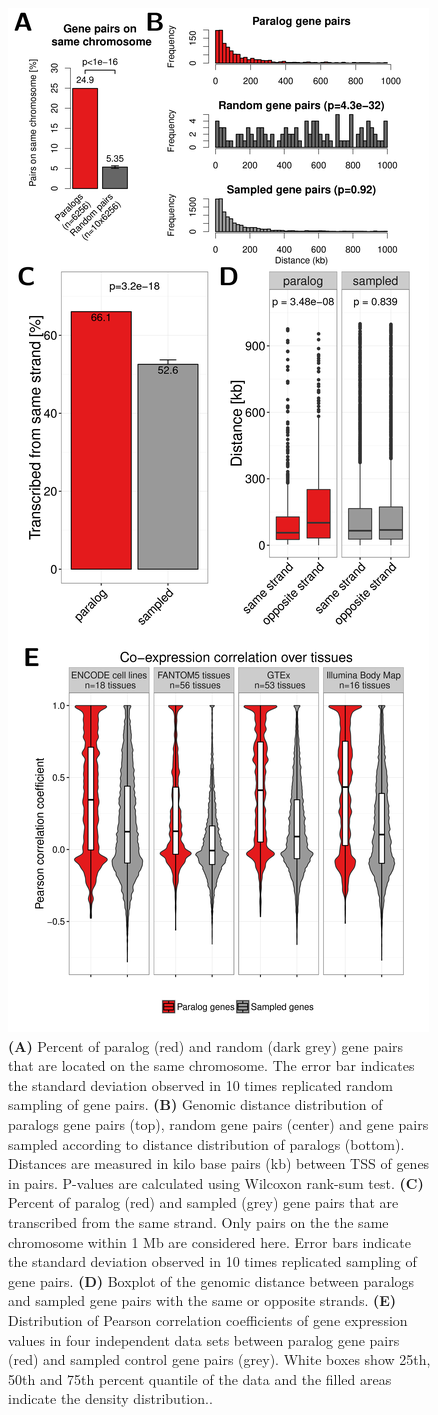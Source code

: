\documentclass[a4paper,twoside=true,openright,parskip=full,chapterprefix=true,11pt,headings=normal,bibliography=totoc,listof=totoc,titlepage=on,captions=tableabove,draft=false]{scrreprt}
\theoremstyle{definition}
\theoremstyle{definition}
\theoremstyle{definition}
\theoremstyle{remark}
\begin{document}
\begin{figure}

{\centering \includegraphics[width=0.5\linewidth]{figures/paralog/fig1_09} 

}

\caption{\textbf{(A)} Percent of paralog (red) and random (dark
grey) gene pairs that are located on the same chromosome. The error bar
indicates the standard deviation observed in 10 times replicated random
sampling of gene pairs. \textbf{(B)} Genomic distance distribution of
paralogs gene pairs (top), random gene pairs (center) and gene pairs
sampled according to distance distribution of paralogs (bottom).
Distances are measured in kilo base pairs (kb) between TSS of genes in
pairs. P-values are calculated using Wilcoxon rank-sum test.
\textbf{(C)} Percent of paralog (red) and sampled (grey) gene pairs that
are transcribed from the same strand. Only pairs on the the same
chromosome within 1 Mb are considered here. Error bars indicate the
standard deviation observed in 10 times replicated sampling of gene
pairs. \textbf{(D)} Boxplot of the genomic distance between paralogs and
sampled gene pairs with the same or opposite strands. \textbf{(E)}
Distribution of Pearson correlation coefficients of gene expression
values in four independent data sets between paralog gene pairs (red)
and sampled control gene pairs (grey). White boxes show 25th, 50th and
75th percent quantile of the data and the filled areas indicate the
density distribution..}\label{fig:paraData}
\end{figure}
\end{document}

